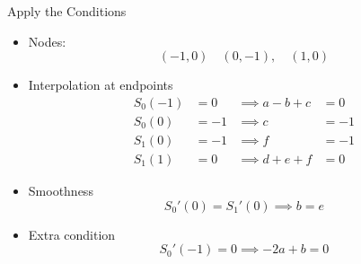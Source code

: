 \documentclass[10pt]{beamer}
\begin{document}
\begin{frame}{Apply the Conditions}

\begin{itemize}
    \item Nodes: 
    $$(-1,0) \quad (0,-1),\quad (1,0)$$
    \item Interpolation at endpoints 
    \begin{align*}
    S_0(-1)&=0  &\implies  a -b+c &=0\\ 
    S_0(0)&=-1  &\implies  c &=-1\\
    S_1(0)&=-1  &\implies  f &=-1\\
    S_1(1)&=0   &\implies  d + e + f &=0
    \end{align*}
    \item Smoothness 
    $$
    S_0'(0) = S_1'(0) \implies b = e
    $$
    \item Extra condition 
    $$
    S_0'(-1) = 0 \implies -2a+b = 0
    $$
\end{itemize}

\end{frame}
\end{document}
